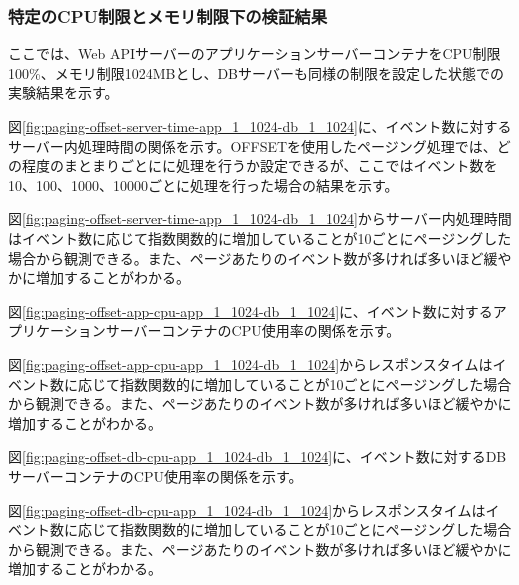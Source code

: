 \documentclass[../../../../main]{subfiles}
\begin{document}
    \subsubsection{特定のCPU制限とメモリ制限下の検証結果}\label{subsubsec:result-paging-offset-only-limit}

    ここでは、Web APIサーバーのアプリケーションサーバーコンテナをCPU制限100\%、メモリ制限1024MBとし、DBサーバーも同様の制限を設定した状態での実験結果を示す。

    \label{subsubsubsec:result-paging-offset-only-limit-server-time}

    図\ref{fig:paging-offset-server-time-app_1_1024-db_1_1024}に、イベント数に対するサーバー内処理時間の関係を示す。OFFSETを使用したページング処理では、どの程度のまとまりごとにに処理を行うか設定できるが、ここではイベント数を10、100、1000、10000ごとに処理を行った場合の結果を示す。

    

    図\ref{fig:paging-offset-server-time-app_1_1024-db_1_1024}からサーバー内処理時間はイベント数に応じて指数関数的に増加していることが10ごとにページングした場合から観測できる。また、ページあたりのイベント数が多ければ多いほど緩やかに増加することがわかる。

    \label{subsubsubsec:result-paging-offset-only-limit-cpu}

    図\ref{fig:paging-offset-app-cpu-app_1_1024-db_1_1024}に、イベント数に対するアプリケーションサーバーコンテナのCPU使用率の関係を示す。

    

    図\ref{fig:paging-offset-app-cpu-app_1_1024-db_1_1024}からレスポンスタイムはイベント数に応じて指数関数的に増加していることが10ごとにページングした場合から観測できる。また、ページあたりのイベント数が多ければ多いほど緩やかに増加することがわかる。

    図\ref{fig:paging-offset-db-cpu-app_1_1024-db_1_1024}に、イベント数に対するDBサーバーコンテナのCPU使用率の関係を示す。

    

    図\ref{fig:paging-offset-db-cpu-app_1_1024-db_1_1024}からレスポンスタイムはイベント数に応じて指数関数的に増加していることが10ごとにページングした場合から観測できる。また、ページあたりのイベント数が多ければ多いほど緩やかに増加することがわかる。
\end{document}
